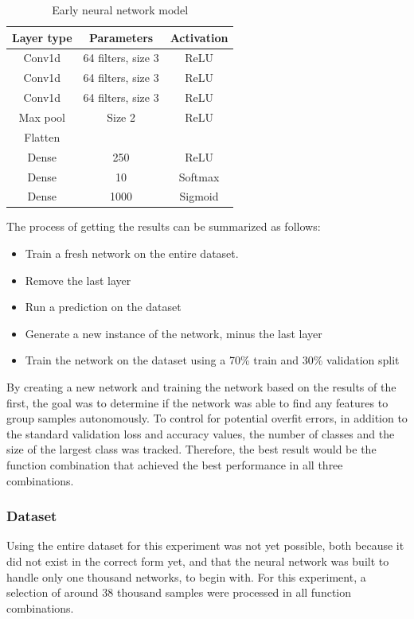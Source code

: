 \begin{table}[ht]
    \centering
    \begin{tabular}{|c|c|c|}
        \hline
        Layer type & Parameters & Activation\\ \hline
        Conv1d & 64 filters, size 3 & ReLU\\ \hline
        Conv1d & 64 filters, size 3 & ReLU\\ \hline
        Conv1d & 64 filters, size 3 & ReLU\\ \hline
        Max pool & Size 2 & ReLU\\ \hline
        Flatten & &\\ \hline
        Dense & 250 & ReLU\\ \hline
        Dense & 10 & Softmax \\ \hline
        Dense & 1000 & Sigmoid \\ \hline
    \end{tabular}
    \caption{Early neural network model}
    \label{tab:earlymodel}
\end{table}

The process of getting the results can be summarized as follows:
\begin{itemize}
    \item Train a fresh network on the entire dataset.
    \item Remove the last layer
    \item Run a prediction on the dataset
    \item Generate a new instance of the network, minus the last layer
    \item Train the network on the dataset using a 70\% train and 30\% validation split
\end{itemize}{}

By creating a new network and training the network based on the results of the first, the goal was to determine if the network was able to find any features to group samples autonomously.
To control for potential overfit errors, in addition to the standard validation loss and accuracy values, the number of classes and the size of the largest class was tracked.
Therefore, the best result would be the function combination that achieved the best performance in all three combinations.

\subsubsection{Dataset}
Using the entire dataset for this experiment was not yet possible, both because it did not exist in the correct form yet, and that the neural network was built to handle only one thousand networks, to begin with.
For this experiment, a selection of around 38 thousand samples were processed in all function combinations.

